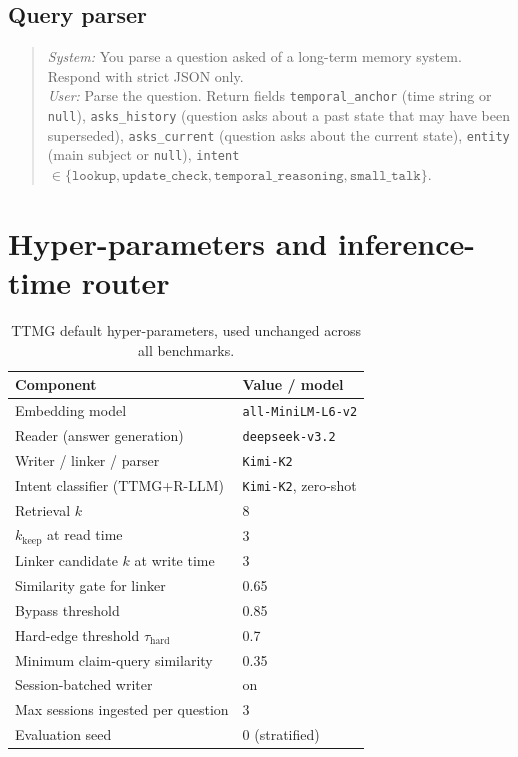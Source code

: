\subsection{Query parser}
\label{app:parser_prompt}
\begin{quote}\small
\emph{System:} You parse a question asked of a long-term memory system.
Respond with strict JSON only.\\[2pt]
\emph{User:} Parse the question. Return fields
\texttt{temporal\_anchor} (time string or \texttt{null}),
\texttt{asks\_history} (question asks about a past state that may have
been superseded), \texttt{asks\_current} (question asks about the
current state), \texttt{entity} (main subject or \texttt{null}),
\texttt{intent} $\in\{\texttt{lookup}, \texttt{update\_check},
\texttt{temporal\_reasoning}, \texttt{small\_talk}\}$.
\end{quote}

\section{Hyper-parameters and inference-time router}
\label{app:hparams}

\begin{table}[h]
  \centering
  \caption{TTMG default hyper-parameters, used unchanged across all
  benchmarks.}
  \label{tab:hyperparams}
  \small
  \begin{tabular}{ll}
    \toprule
    Component & Value / model \\
    \midrule
    Embedding model & \texttt{all-MiniLM-L6-v2} \\
    Reader (answer generation) & \texttt{deepseek-v3.2} \\
    Writer / linker / parser & \texttt{Kimi-K2} \\
    Intent classifier (TTMG+R-LLM) & \texttt{Kimi-K2}, zero-shot \\
    Retrieval $k$ & 8 \\
    $k_{\text{keep}}$ at read time & 3 \\
    Linker candidate $k$ at write time & 3 \\
    Similarity gate for linker & 0.65 \\
    Bypass threshold & 0.85 \\
    Hard-edge threshold $\tau_{\text{hard}}$ & 0.7 \\
    Minimum claim-query similarity & 0.35 \\
    Session-batched writer & on \\
    Max sessions ingested per question & 3 \\
    Evaluation seed & 0 (stratified) \\
    \bottomrule
  \end{tabular}
\end{table}

